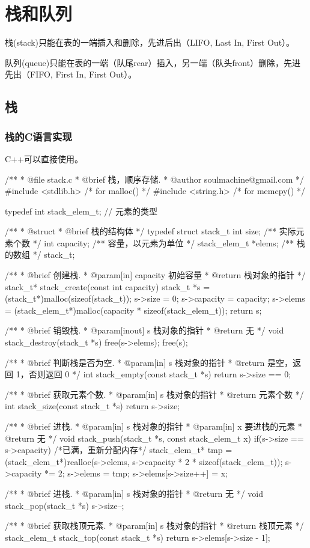 \chapter{栈和队列}

栈(stack)只能在表的一端插入和删除，先进后出（LIFO, Last In, First Out）。

队列(queue)只能在表的一端（队尾rear）插入，另一端（队头front）删除，先进先出（FIFO, First In, First Out）。

\section{栈} %

\subsection{栈的C语言实现}
C++可以直接使用。

\begin{Codex}[label=stack.c]
/**
 * @file stack.c
 * @brief 栈，顺序存储.
 * @author soulmachine@gmail.com
 */
#include <stdlib.h>  /* for malloc() */
#include <string.h>  /* for memcpy() */

typedef int stack_elem_t; // 元素的类型

/**
 * @struct
 * @brief 栈的结构体
 */
typedef struct stack_t {
    int     size;  /** 实际元素个数 */
    int     capacity; /** 容量，以元素为单位 */
    stack_elem_t  *elems;   /** 栈的数组 */
}stack_t;

/**
 * @brief 创建栈.
 * @param[in] capacity 初始容量
 * @return 栈对象的指针
 */
stack_t* stack_create(const int capacity) {
    stack_t *s = (stack_t*)malloc(sizeof(stack_t));
    s->size = 0;
    s->capacity = capacity;
    s->elems = (stack_elem_t*)malloc(capacity * sizeof(stack_elem_t));
    return s;
}

/**
 * @brief 销毁栈.
 * @param[inout] s 栈对象的指针
 * @return 无
 */
void stack_destroy(stack_t *s) {
    free(s->elems);
    free(s);
}

/**
 * @brief 判断栈是否为空.
 * @param[in] s 栈对象的指针
 * @return 是空，返回 1，否则返回 0
 */
int stack_empty(const stack_t *s) {
    return s->size == 0;
}

/**
 * @brief 获取元素个数.
 * @param[in] s 栈对象的指针
 * @return 元素个数
 */
int stack_size(const stack_t *s) {
    return s->size;
}

/**
 * @brief 进栈.
 * @param[in] s 栈对象的指针
 * @param[in] x 要进栈的元素
 * @return 无
 */
void stack_push(stack_t *s, const stack_elem_t x)
{
    if(s->size == s->capacity) { /*已满，重新分配内存*/
        stack_elem_t* tmp = (stack_elem_t*)realloc(s->elems,
            s->capacity * 2 * sizeof(stack_elem_t));
        s->capacity *= 2;
        s->elems = tmp;
    }
    s->elems[s->size++] = x;
}

/**
 * @brief 进栈.
 * @param[in] s 栈对象的指针
 * @return 无
 */
void stack_pop(stack_t *s) {
    s->size--;
}

/**
 * @brief 获取栈顶元素.
 * @param[in] s 栈对象的指针
 * @return 栈顶元素
 */
stack_elem_t stack_top(const stack_t *s) {
    return s->elems[s->size - 1];
}
\end{Codex}


